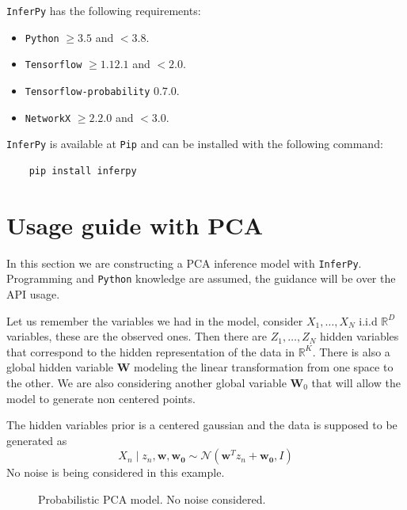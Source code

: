 \texttt{InferPy} has the following requirements:
\begin{itemize}
    \item \texttt{Python} \( \geq 3.5 \) and \( < 3.8 \).  
    \item \texttt{Tensorflow} \(\geq  1.12.1 \) and \( < 2.0 \).
    \item \texttt{Tensorflow-probability} \( 0.7.0 \).
    \item \texttt{NetworkX} \( \geq 2.2.0 \) and \( < 3.0 \).   
\end{itemize}

\texttt{InferPy} is available at \texttt{Pip} and can be installed with the following command:

\begin{verbatim}
    pip install inferpy
\end{verbatim}

\section{Usage guide with PCA}

In this section we are constructing a PCA inference model with \texttt{InferPy}. Programming and \texttt{Python} knowledge are assumed, the guidance will be over the API usage.

Let us remember the variables we had in the model, consider \( X_1, \dots, X_N \) i.i.d \( \mathbb{R}^D \) variables, these are the observed ones. Then there are \( Z_1,\dots,Z_N \) hidden variables that correspond to the hidden representation of the data in \( \mathbb{R}^K \). There is also a global hidden variable \( \bm{W} \) modeling the linear transformation from one space to the other. We are also considering another global variable \( \bm{W}_0 \) that will allow the model to generate non centered points. 

The hidden variables prior is a centered gaussian and the data is supposed to be generated as
\[
     X_n \mid z_n, \bm{w}, \bm{w_0} \sim \mathcal{N}(\bm{w}^T z_n + \bm{w_0}, I)
\]
No noise is being considered in this example.

\begin{figure}[h!]
    \centering
    \caption{Probabilistic PCA model. No noise considered.}
  \end{figure}
  
